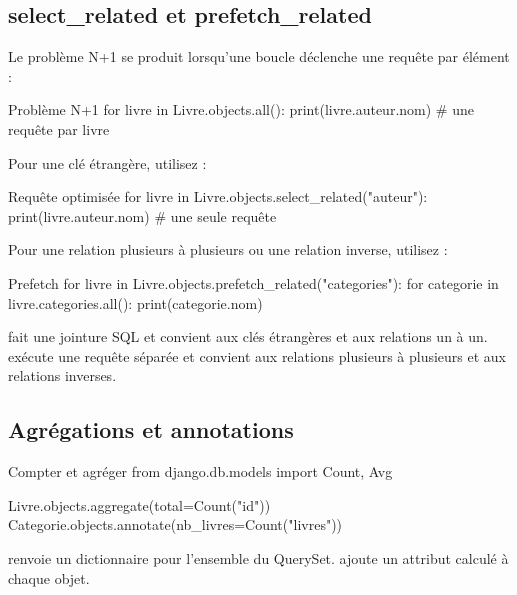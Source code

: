 \subsection{select\_related et prefetch\_related}

Le problème N+1 se produit lorsqu'une boucle déclenche une requête par élément :

\begin{codebox}[python]{Problème N+1}
for livre in Livre.objects.all():
    print(livre.auteur.nom)   # une requête par livre
\end{codebox}

Pour une clé étrangère, utilisez  :

\begin{codebox}[python]{Requête optimisée}
for livre in Livre.objects.select_related("auteur"):
    print(livre.auteur.nom)   # une seule requête
\end{codebox}

Pour une relation plusieurs à plusieurs ou une relation inverse, utilisez
 :

\begin{codebox}[python]{Prefetch}
for livre in Livre.objects.prefetch_related("categories"):
    for categorie in livre.categories.all():
        print(categorie.nom)
\end{codebox}

\begin{bonne}
 fait une jointure SQL et convient aux clés étrangères et
aux relations un à un.  exécute une requête séparée et
convient aux relations plusieurs à plusieurs et aux relations inverses.
\end{bonne}

\subsection{Agrégations et annotations}

\begin{codebox}[python]{Compter et agréger}
from django.db.models import Count, Avg

Livre.objects.aggregate(total=Count("id"))
Categorie.objects.annotate(nb_livres=Count("livres"))
\end{codebox}

 renvoie un dictionnaire pour l'ensemble du QuerySet.
 ajoute un attribut calculé à chaque objet.


